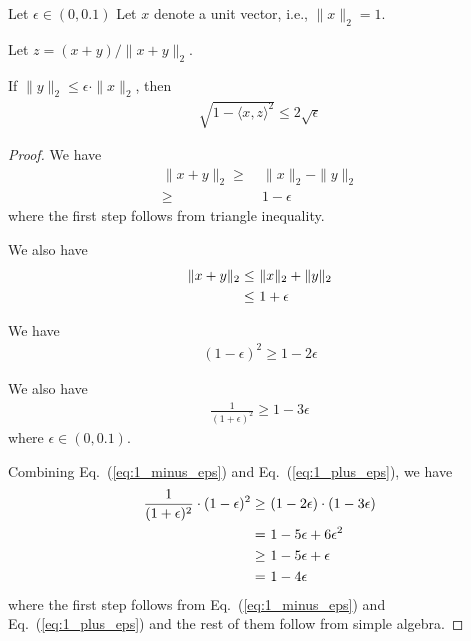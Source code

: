 \begin{lemma}
Let $\epsilon \in (0,0.1)$
Let $x$ denote a unit vector, i.e., $\| x \|_2 = 1$.

Let $z = (x+y) / \| x + y\|_2$.

If $ \| y \|_2 \leq \epsilon \cdot \| x \|_2$, then
\begin{align*}
\sqrt{1-\langle x, z \rangle^2} \leq 2 \sqrt{\epsilon} 
\end{align*}
\end{lemma}
\begin{proof}
We have
\begin{align*}
 \| x + y \|_2 
 \geq & ~\| x \|_2 - \| y \|_2 \\
\geq & ~ 1- \epsilon
\end{align*}
where the first step follows from triangle inequality.

We also have
\begin{align}\label{eq:x_y_bound}
 \| x + y \|_2 
 \leq & ~\| x \|_2 + \| y \|_2 \notag \\
\leq & ~ 1 + \epsilon
\end{align}


We have
\begin{align}\label{eq:1_minus_eps}
(1- \epsilon)^2 \geq 1- 2\epsilon
\end{align}

We also have
\begin{align}\label{eq:1_plus_eps}
\frac{1}{(1+\epsilon)^2} \geq 1- 3 \epsilon
\end{align}
where $\epsilon \in (0,0.1)$.



Combining Eq.~(\ref{eq:1_minus_eps}) and Eq.~(\ref{eq:1_plus_eps}), we have
\begin{align}\label{eq:1_2eps}
\frac{1}{(1+\epsilon)^2} \cdot ( 1 - \epsilon )^2 \geq &~ (1-2\epsilon) \cdot (1-3 \epsilon) \notag\\
=&~ 1 -5 \epsilon + 6 \epsilon^2 \notag\\
\geq &~  1 - 5\epsilon + \epsilon \notag\\
=&~ 1 - 4 \epsilon 
\end{align}
where the first step follows from Eq.~(\ref{eq:1_minus_eps}) and Eq.~(\ref{eq:1_plus_eps}) and the rest of them follow from simple algebra.



\end{proof}
